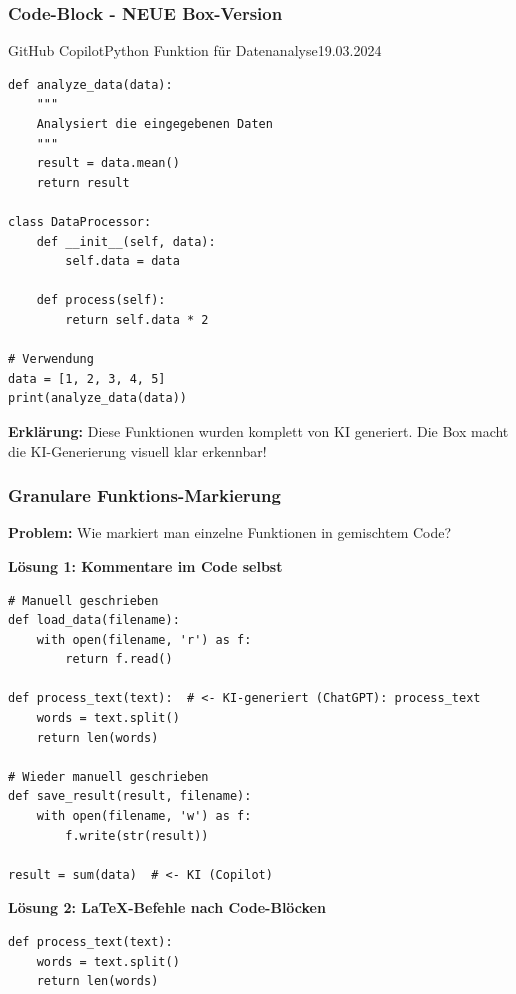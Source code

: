 \documentclass[../main.tex]{subfiles}
\begin{document}
\subsubsection{Code-Block - NEUE Box-Version}
\begin{aicode}{GitHub Copilot}{Python Funktion für Datenanalyse}{19.03.2024}
\begin{verbatim}
def analyze_data(data):
    """
    Analysiert die eingegebenen Daten
    """
    result = data.mean()
    return result

class DataProcessor:
    def __init__(self, data):
        self.data = data
    
    def process(self):
        return self.data * 2

# Verwendung
data = [1, 2, 3, 4, 5]
print(analyze_data(data))
\end{verbatim}

\textbf{Erklärung:} Diese Funktionen wurden komplett von KI generiert.
Die Box macht die KI-Generierung visuell klar erkennbar!
\end{aicode}

\subsubsection{Granulare Funktions-Markierung}

\textbf{Problem:} Wie markiert man einzelne Funktionen in gemischtem Code?

\textbf{Lösung 1: Kommentare im Code selbst}
\begin{verbatim}
# Manuell geschrieben
def load_data(filename):
    with open(filename, 'r') as f:
        return f.read()

def process_text(text):  # <- KI-generiert (ChatGPT): process_text
    words = text.split()
    return len(words)

# Wieder manuell geschrieben
def save_result(result, filename):
    with open(filename, 'w') as f:
        f.write(str(result))

result = sum(data)  # <- KI (Copilot)
\end{verbatim}

\textbf{Lösung 2: LaTeX-Befehle nach Code-Blöcken}

\begin{verbatim}
def process_text(text):
    words = text.split()
    return len(words)
\end{verbatim}
\end{document}
